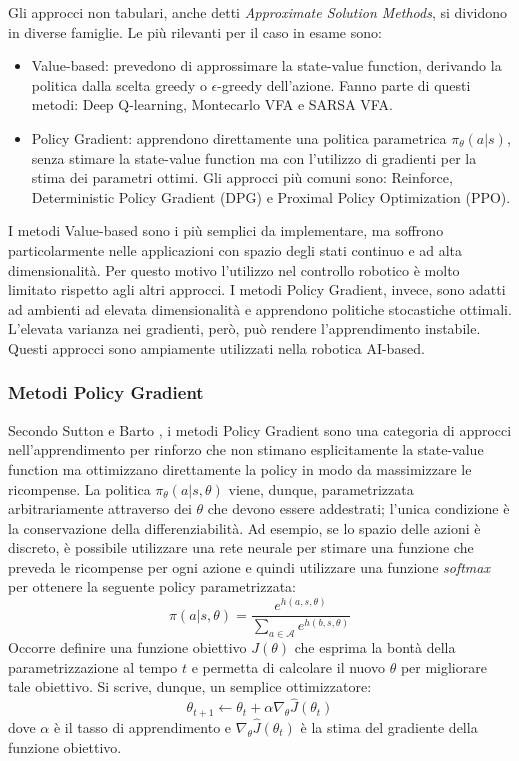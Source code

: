 Gli approcci non tabulari, anche detti \textit{Approximate Solution Methods}, si dividono in diverse famiglie. Le più rilevanti per il caso in esame sono: 
\begin{itemize}
    \item Value-based: prevedono di approssimare la state-value function, derivando la politica dalla scelta greedy o $\epsilon$-greedy dell'azione. Fanno parte di questi metodi: Deep Q-learning, Montecarlo VFA e SARSA VFA.
    \item Policy Gradient: apprendono direttamente una politica parametrica $\pi_\theta(a|s)$, senza stimare la state-value function ma con l'utilizzo di gradienti per la stima dei parametri ottimi. Gli approcci più comuni sono: Reinforce, Deterministic Policy Gradient (DPG) e Proximal Policy Optimization (PPO).
\end{itemize}
I metodi Value-based sono i più semplici da implementare, ma soffrono particolarmente nelle applicazioni con spazio degli stati continuo e ad alta dimensionalità. Per questo motivo l'utilizzo nel controllo robotico è molto limitato rispetto agli altri approcci. I metodi Policy Gradient, invece, sono adatti ad ambienti ad elevata dimensionalità e apprendono politiche stocastiche ottimali. L'elevata varianza nei gradienti, però, può rendere l'apprendimento instabile. Questi approcci sono ampiamente utilizzati nella robotica AI-based. 


\subsubsection{Metodi Policy Gradient}
Secondo Sutton e Barto \cite{sutton2018reinforcement}, i metodi Policy Gradient sono una categoria di approcci nell'apprendimento per rinforzo che non stimano esplicitamente la state-value function ma ottimizzano direttamente la policy in modo da massimizzare le ricompense. La politica $\pi_\theta(a|s,\theta)$ viene, dunque, parametrizzata arbitrariamente attraverso dei $\theta$ che devono essere addestrati; l'unica condizione è la conservazione della differenziabilità. Ad esempio, se lo spazio delle azioni è discreto, è possibile utilizzare una rete neurale per stimare una funzione che preveda le ricompense per ogni azione e quindi utilizzare una funzione \textit{softmax} per ottenere la seguente policy parametrizzata:
\begin{equation}\pi(a|s,\theta)=\frac{e^{h(a,s,\theta)}}{\sum_{a \in \mathcal{A}}e^{h(b,s,\theta)}}\end{equation}
Occorre definire una funzione obiettivo $J(\theta)$ che esprima la bontà della parametrizzazione al tempo $t$ e permetta di calcolare il nuovo $\theta$ per migliorare tale obiettivo. Si scrive, dunque, un semplice ottimizzatore:
\begin{equation}\theta_{t+1}\xleftarrow{}\theta_t +\alpha \nabla_\theta \hat{J}(\theta_t)\end{equation}
dove $\alpha$ è il tasso di apprendimento e $\nabla_\theta \hat{J}(\theta_t)$ è la stima del gradiente della funzione obiettivo.

